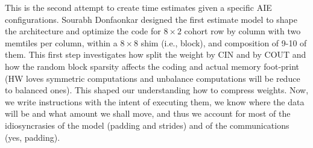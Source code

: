 \documentclass[conference]{IEEEtran}
\begin{document}
This is the second attempt to create time estimates given a specific
AIE configurations. Sourabh Donfaonkar designed the first estimate
model to shape the architecture and optimize the code for $8\times 2$
cohort row by column with two memtiles per column, within a $8\times
8$ shim (i.e., block), and composition of 9-10 of them. This first
step investigates how split the weight by CIN and by COUT and how the
random block sparsity affects the coding and actual memory foot-print
(HW loves symmetric computations and unbalance computations will
be reduce to balanced ones). This shaped our understanding how to
compress weights. Now, we write instructions with the intent of
executing them, we know where the data will be and what amount we
shall move, and thus we account for most of the idiosyncrasies of the
model (padding and strides) and of the communications (yes, padding).
\end{document}
